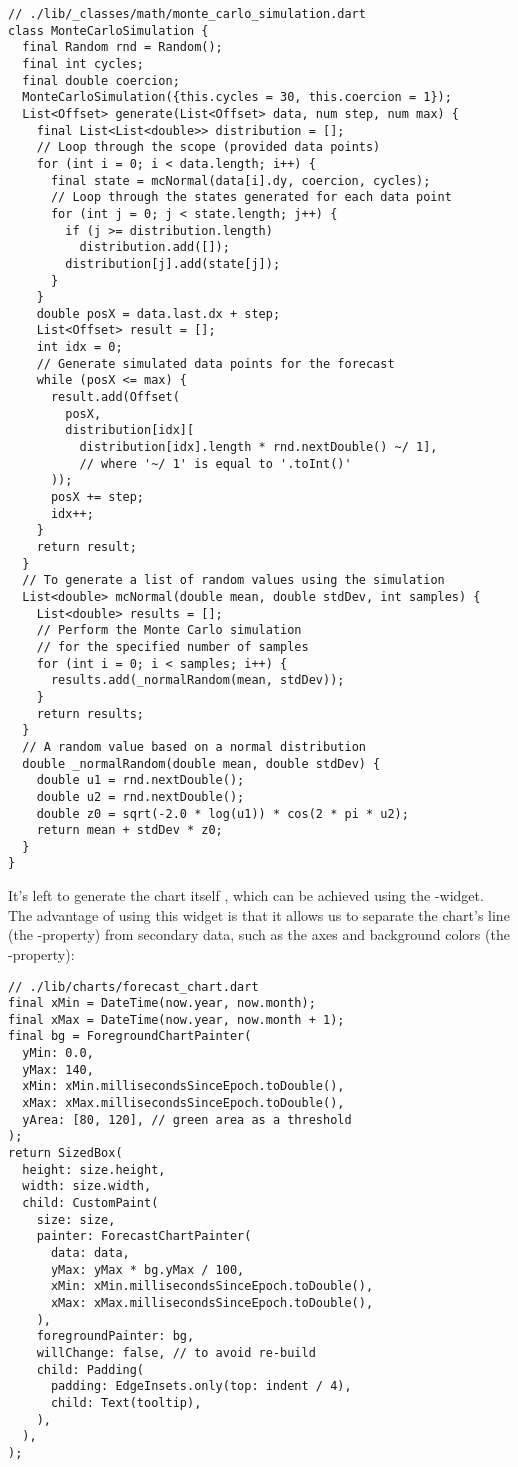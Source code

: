 \begin{lstlisting}
// ./lib/_classes/math/monte_carlo_simulation.dart
class MonteCarloSimulation {
  final Random rnd = Random();
  final int cycles;
  final double coercion;
  MonteCarloSimulation({this.cycles = 30, this.coercion = 1});
  List<Offset> generate(List<Offset> data, num step, num max) {
    final List<List<double>> distribution = [];
    // Loop through the scope (provided data points)
    for (int i = 0; i < data.length; i++) {
      final state = mcNormal(data[i].dy, coercion, cycles);
      // Loop through the states generated for each data point
      for (int j = 0; j < state.length; j++) {
        if (j >= distribution.length)
          distribution.add([]);
        distribution[j].add(state[j]);
      }
    }
    double posX = data.last.dx + step;
    List<Offset> result = [];
    int idx = 0;
    // Generate simulated data points for the forecast
    while (posX <= max) {
      result.add(Offset(
        posX, 
        distribution[idx][
          distribution[idx].length * rnd.nextDouble() ~/ 1],
          // where '~/ 1' is equal to '.toInt()'
      ));
      posX += step;
      idx++;
    }
    return result;
  }
  // To generate a list of random values using the simulation
  List<double> mcNormal(double mean, double stdDev, int samples) {
    List<double> results = [];
    // Perform the Monte Carlo simulation 
    // for the specified number of samples
    for (int i = 0; i < samples; i++) {
      results.add(_normalRandom(mean, stdDev));
    }
    return results;
  }
  // A random value based on a normal distribution
  double _normalRandom(double mean, double stdDev) {
    double u1 = rnd.nextDouble();
    double u2 = rnd.nextDouble();
    double z0 = sqrt(-2.0 * log(u1)) * cos(2 * pi * u2);
    return mean + stdDev * z0;
  }
}
\end{lstlisting}

\noindent It's left to generate the chart itself , which can be achieved using the -widget. 
The advantage of using this widget is that it allows us to separate the chart's line (the -property) from 
secondary data, such as the axes and background colors (the -property):

\begin{lstlisting}
// ./lib/charts/forecast_chart.dart
final xMin = DateTime(now.year, now.month);
final xMax = DateTime(now.year, now.month + 1);
final bg = ForegroundChartPainter(
  yMin: 0.0,
  yMax: 140,
  xMin: xMin.millisecondsSinceEpoch.toDouble(),
  xMax: xMax.millisecondsSinceEpoch.toDouble(),
  yArea: [80, 120], // green area as a threshold
);
return SizedBox(
  height: size.height,
  width: size.width,
  child: CustomPaint(
    size: size,
    painter: ForecastChartPainter(
      data: data,
      yMax: yMax * bg.yMax / 100,
      xMin: xMin.millisecondsSinceEpoch.toDouble(),
      xMax: xMax.millisecondsSinceEpoch.toDouble(),
    ),
    foregroundPainter: bg,
    willChange: false, // to avoid re-build
    child: Padding(
      padding: EdgeInsets.only(top: indent / 4),
      child: Text(tooltip),
    ),
  ),
);
\end{lstlisting}

